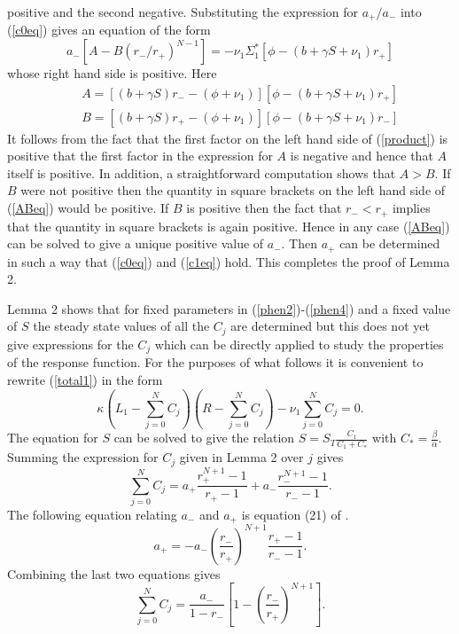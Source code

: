\documentclass{article}
\begin{document}
positive and the second negative. Substituting the expression for $a_+/a_-$ 
into (\ref{c0eq}) gives an equation of the form 
\begin{equation}\label{ABeq}
a_-[A-B(r_-/r_+)^{N-1}]=-\nu_1\Sigma_1^*[\phi-(b+\gamma S+\nu_1)r_+]
\end{equation}
whose right hand side is positive. Here
\begin{eqnarray}
&&A=[(b+\gamma S)r_--(\phi+\nu_1)][\phi-(b+\gamma S+\nu_1)r_+]\\
&&B=[(b+\gamma S)r_+-(\phi+\nu_1)][\phi-(b+\gamma S+\nu_1)r_-]
\end{eqnarray}
It follows from the fact that the first factor on the left hand side of 
(\ref{product}) is positive that the first factor in the expression for $A$ is
negative and hence that $A$ itself is positive. In addition, a straightforward
computation shows that $A>B$. If $B$ were 
not positive then the quantity in square brackets on the left hand side of 
(\ref{ABeq}) would be positive. If $B$ is positive then the fact that 
$r_-<r_+$ implies that the quantity in square brackets is again positive. 
Hence in any case (\ref{ABeq}) can be solved to give a unique positive value 
of $a_-$. Then $a_+$ can be determined in such a way that (\ref{c0eq}) and 
(\ref{c1eq}) hold. This completes the proof of Lemma 2.

Lemma 2 shows that for fixed parameters in (\ref{phen2})-(\ref{phen4}) and a 
fixed value of $S$ the steady state values of all the $C_j$ are determined but 
this does not yet give expressions for the $C_j$ which can be directly applied 
to study the properties of the response function. For the purposes of what
follows it is convenient to rewrite (\ref{total1}) in the form
\begin{equation}\label{ctotaleq}
\kappa (L_1-\sum_{j=0}^NC_j)(R-\sum_{j=0}^N  C_j)-\nu_1\sum_{j=0}^N C_j=0.
\end{equation}
The equation for $S$ can be solved to give the relation 
$S=S_T\frac{C_1}{C_1+C_*}$ with $C_*=\frac{\beta}{\alpha}$. Summing the
expression for $C_j$ given in Lemma 2 over $j$ gives
\begin{equation}
\sum_{j=0}^N C_j=a_+\frac{r_+^{N+1}-1}{r_+-1}+a_-\frac{r_-^{N+1}-1}{r_--1}.
\end{equation}
The following equation relating $a_-$ and $a_+$ is equation (21) of 
\cite{francois13}. 
\begin{equation}\label{aplusminus}
a_+=-a_-\left(\frac{r_-}{r_+}\right)^{N+1}\frac{r_+-1}{r_--1}.
\end{equation}
Combining the last two equations gives
\begin{equation}\label{sumcj}
\sum_{j=0}^NC_j=\frac{a_-}{1-r_-}\left[1-\left(\frac{r_-}{r_+}\right)^{N+1}
\right].
\end{equation}
\end{document}
